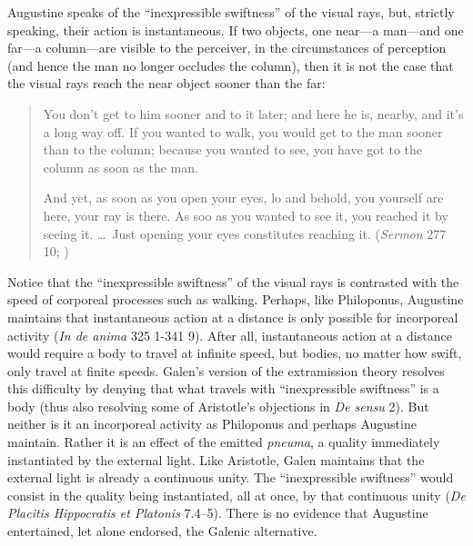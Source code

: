 \documentclass[12pt]{article}
\begin{document}
Augustine speaks of the ``inexpressible swiftness'' of the visual rays, but, strictly speaking, their action is instantaneous. If two objects, one near---a man---and one far---a column---are visible to the perceiver, in the circumstances of perception (and hence the man no longer occludes the column), then it is not the case that the visual rays reach the near object sooner than the far: 
\begin{quotation}
	You don't get to him sooner and to it later; and here he is, nearby, and it's a long way off. If you wanted to walk, you would get to the man sooner than to the column; because you wanted to see, you have got to the column as soon as the man. 
	
	And yet, as soon as you open your eyes, lo and behold, you yourself are here, your ray is there. As soo as you wanted to see it, you reached it by seeing it. \ldots\ Just opening your eyes constitutes reaching it. (\emph{Sermon} 277 10; \citealt[39]{Hill:1994aa})
\end{quotation}

Notice that the ``inexpressible swiftness'' of the visual rays is contrasted with the speed of corporeal processes such as walking. Perhaps, like Philoponus, Augustine maintains that instantaneous action at a distance is only possible for incorporeal activity (\emph{In de anima} 325 1-341 9). After all, instantaneous action at a distance would require a body to travel at infinite speed, but bodies, no matter how swift, only travel at finite speeds. Galen's version of the extramission theory resolves this difficulty by denying that what travels with ``inexpressible swiftness'' is a body (thus also resolving some of Aristotle's objections in \emph{De sensu} 2). But neither is it an incorporeal activity as Philoponus and perhaps Augustine maintain. Rather it is an effect of the emitted \emph{pneuma}, a quality immediately instantiated by the external light. Like Aristotle, Galen maintains that the external light is already a continuous unity. The ``inexpressible swiftness'' would consist in the quality being instantiated, all at once, by that continuous unity (\emph{De Placitis Hippocratis et Platonis} 7.4--5). There is no evidence that Augustine entertained, let alone endorsed, the Galenic alternative.

\end{document}
